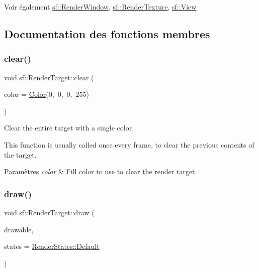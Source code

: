 \begin{DoxySeeAlso}{Voir également}
\hyperlink{classsf_1_1RenderWindow}{sf\+::\+Render\+Window}, \hyperlink{classsf_1_1RenderTexture}{sf\+::\+Render\+Texture}, \hyperlink{classsf_1_1View}{sf\+::\+View} 
\end{DoxySeeAlso}


\subsection{Documentation des fonctions membres}
\mbox{\label{classsf_1_1RenderTarget_a6bb6f0ba348f2b1e2f46114aeaf60f26}} 
\subsubsection{\texorpdfstring{clear()}{clear()}}
{\footnotesize\ttfamily void sf\+::\+Render\+Target\+::clear (\begin{DoxyParamCaption}\item[{const \hyperlink{classsf_1_1Color}{Color} \&}]{color = {\ttfamily \hyperlink{classsf_1_1Color}{Color}(0,~0,~0,~255)} }\end{DoxyParamCaption})}



Clear the entire target with a single color. 

This function is usually called once every frame, to clear the previous contents of the target.


\begin{DoxyParams}{Paramètres}
{\em color} & Fill color to use to clear the render target \\
\hline
\end{DoxyParams}
\mbox{\label{classsf_1_1RenderTarget_a12417a3bcc245c41d957b29583556f39}} 
\subsubsection{\texorpdfstring{draw()}{draw()}\hspace{0.1cm}{\footnotesize\ttfamily [1/2]}}
{\footnotesize\ttfamily void sf\+::\+Render\+Target\+::draw (\begin{DoxyParamCaption}\item[{const \hyperlink{classsf_1_1Drawable}{Drawable} \&}]{drawable,  }\item[{const \hyperlink{classsf_1_1RenderStates}{Render\+States} \&}]{states = {\ttfamily \hyperlink{classsf_1_1RenderStates_ad29672df29f19ce50c3021d95f2bb062}{Render\+States\+::\+Default}} }\end{DoxyParamCaption})}



